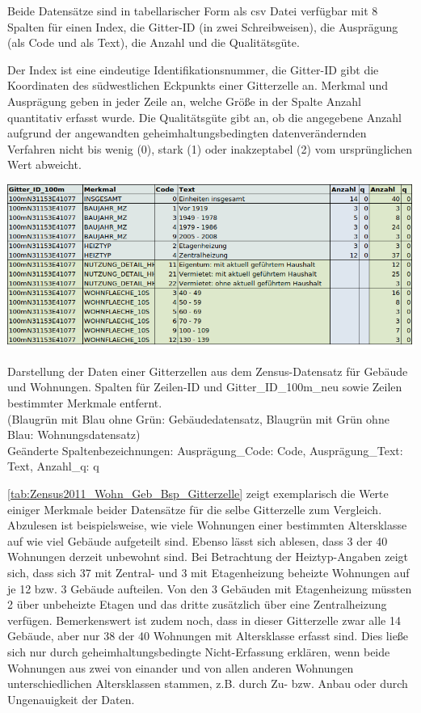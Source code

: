 				Beide Datensätze sind in tabellarischer Form als csv Datei verfügbar mit 8 Spalten für einen Index, die Gitter-ID (in zwei Schreibweisen), die Ausprägung (als Code und als Text), die Anzahl und die Qualitätsgüte. 
				
				Der Index ist eine eindeutige Identifikationsnummer, die Gitter-ID gibt die Koordinaten des südwestlichen Eckpunkts einer Gitterzelle an. Merkmal und Ausprägung geben in jeder Zeile an, welche Größe in der Spalte Anzahl quantitativ erfasst wurde. Die Qualitätsgüte gibt an, ob die angegebene Anzahl aufgrund der angewandten geheimhaltungsbedingten datenverändernden Verfahren nicht bis wenig (0), stark (1) oder inakzeptabel (2) vom ursprünglichen Wert abweicht. 
			
				\begin{table}[H]
					\includegraphics[width=1.00\textwidth]{Medien/tables/Zensus_2011_Wohn_Geb_Bsp_Gitterzelle.png}
					\caption{Darstellung der Daten einer Gitterzellen aus dem Zensus-Datensatz für Gebäude und Wohnungen. Spalten für Zeilen-ID und Gitter\_ID\_100m\_neu sowie Zeilen bestimmter Merkmale entfernt. \\ 
					(Blaugrün mit Blau ohne Grün: Gebäudedatensatz, Blaugrün mit Grün ohne Blau: Wohnungsdatensatz)\\
					Geänderte Spaltenbezeichnungen: Ausprägung\_Code: Code, Ausprägung\_Text: Text, Anzahl\_q: q}
					\label{tab:Zensus2011_Wohn_Geb_Bsp_Gitterzelle}
				\end{table}
			
				\autoref{tab:Zensus2011_Wohn_Geb_Bsp_Gitterzelle} zeigt exemplarisch die Werte einiger Merkmale beider Datensätze für die selbe Gitterzelle zum Vergleich. Abzulesen ist beispielsweise, wie viele Wohnungen einer bestimmten Altersklasse auf wie viel Gebäude aufgeteilt sind. Ebenso lässt sich ablesen, dass 3 der 40 Wohnungen derzeit unbewohnt sind. Bei Betrachtung der Heiztyp-Angaben zeigt sich, dass sich 37 mit Zentral- und 3 mit Etagenheizung beheizte Wohnungen auf je 12 bzw. 3 Gebäude aufteilen. Von den 3 Gebäuden mit Etagenheizung müssten 2 über unbeheizte Etagen und das dritte zusätzlich über eine Zentralheizung verfügen. Bemerkenswert ist zudem noch, dass in dieser Gitterzelle zwar alle 14 Gebäude, aber nur 38 der 40 Wohnungen mit Altersklasse erfasst sind. Dies ließe sich nur durch geheimhaltungsbedingte Nicht-Erfassung erklären, wenn beide Wohnungen aus zwei von einander und von allen anderen Wohnungen unterschiedlichen Altersklassen stammen, z.B. durch Zu- bzw. Anbau oder durch Ungenauigkeit der Daten.  
				
